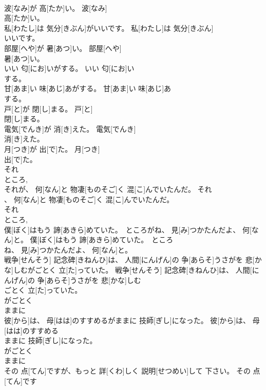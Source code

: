\documentclass[8pt]{extreport}
\begin{document}
\begin{CJK}{UTF8}{min}
\\	波[なみ]が 高[たか]い。	波[なみ]
\\	高[たか]い。	
\\	私[わたし]は 気分[きぶん]がいいです。	私[わたし]は 気分[きぶん]
\\	いいです。	
\\	部屋[へや]が 暑[あつ]い。	部屋[へや]
\\	暑[あつ]い。	
\\	いい 匂[にお]いがする。	いい 匂[にお]い
\\	する。	
\\	甘[あま]い 味[あじ]あがする。	甘[あま]い 味[あじ]あ
\\	する。	
\\	戸[と]が 閉[し]まる。	戸[と]
\\	閉[し]まる。	
\\	電気[でんき]が 消[き]えた。	電気[でんき]
\\	消[き]えた。	
\\	月[つき]が 出[で]た。	月[つき]
\\	出[で]た。	
\\	それ 
\\	ところ, 
\\	それが、 何[なん]と 物凄[ものそご]く 混[こ]んでいたんだ。	それ
\\	、 何[なん]と 物凄[ものそご]く 混[こ]んでいたんだ。	
\\	それ 
\\	ところ, 
\\	僕[ぼく]はもう 諦[あきら]めていた。　ところがね、 見[み]つかたんだよ、 何[なん]と。	僕[ぼく]はもう 諦[あきら]めていた。　ところ
\\	ね、 見[み]つかたんだよ、 何[なん]と。	
\\	戦争[せんそう] 記念碑[きねんひ]は、 人間[にんげん]の 争[あらそ]うさがを 悲[かな]しむがごとく 立[た]っていた。	戦争[せんそう] 記念碑[きねんひ]は、 人間[にんげん]の 争[あらそ]うさがを 悲[かな]しむ
\\	ごとく 立[た]っていた。	
\\	がごとく 
\\	ままに 
\\	彼[から]は、 母[はは]のすすめるがままに 技師[ぎし]になった。	彼[から]は、 母[はは]のすすめる
\\	ままに 技師[ぎし]になった。	
\\	がごとく 
\\	ままに 
\\	その 点[てん]ですが、もっと 詳[くわ]しく 説明[せつめい]して 下さい。	その 点[てん]です

\end{CJK}
\end{document}
